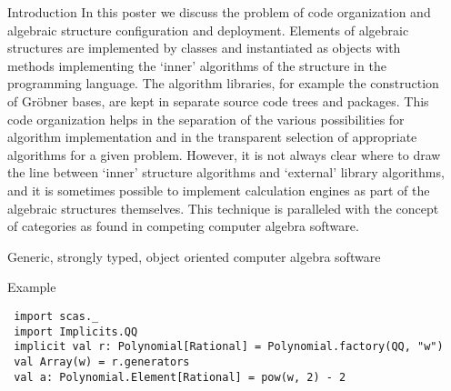 \documentclass[final]{beamer}
\begin{document}
\begin{frame}[fragile]
\begin{columns}[t]
\begin{column}{.3\linewidth}
\begin{block}{\large Introduction}
In this poster we discuss the problem of code organization and
algebraic structure configuration and deployment. Elements of algebraic
structures are implemented by classes and instantiated as objects with
methods implementing the `inner' algorithms of the structure in the
programming language. The algorithm libraries, for example the
construction of Gr\"obner bases, are kept in separate source code trees
and packages. This code organization helps in the separation of the
various possibilities for algorithm implementation and in the
transparent selection of appropriate algorithms for a given problem.
However, it is not always clear where to draw the line between `inner'
structure algorithms and `external' library algorithms, and it is
sometimes possible to implement calculation engines as part of the
algebraic structures themselves. This technique is paralleled
with the concept of categories as found in competing computer
algebra software.
  \end{block}
  \hfill
  \begin{block}{\large Generic, strongly typed, object oriented computer algebra software}
      \centering
  \end{block}
  \hfill
  \begin{block}{\large Example}
\tiny 
\begin{lstlisting} 
 import scas._
 import Implicits.QQ
 implicit val r: Polynomial[Rational] = Polynomial.factory(QQ, "w")
 val Array(w) = r.generators
 val a: Polynomial.Element[Rational] = pow(w, 2) - 2 
\end{lstlisting} 
%
%
  \end{block}
\end{column}


\begin{column}{.3\linewidth}
 

\end{column}
\end{columns}
\end{frame}
\end{document}
